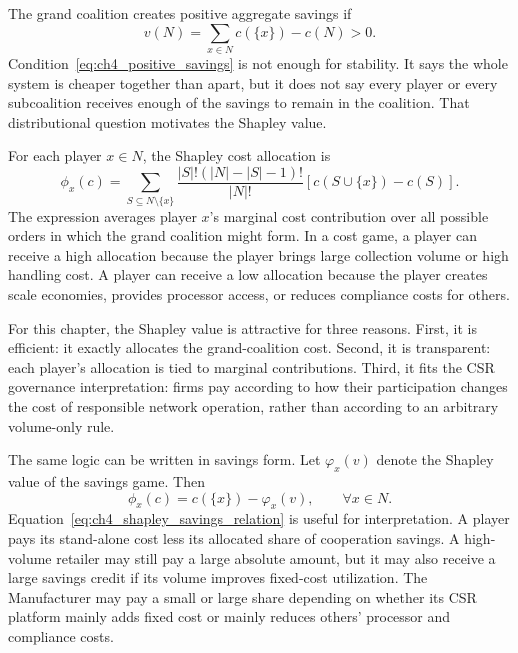 The grand coalition creates positive aggregate savings if
\begin{equation}
\label{eq:ch4_positive_savings}
v(N)=\sum_{x\in N}c(\{x\})-c(N)>0.
\end{equation}
Condition~\eqref{eq:ch4_positive_savings} is not enough for stability. It says the whole system is cheaper together than apart, but it does not say every player or every subcoalition receives enough of the savings to remain in the coalition. That distributional question motivates the Shapley value.

For each player $x\in N$, the Shapley cost allocation is
\begin{equation}
\label{eq:shapley}
\phi_x(c)=
\sum_{S\subseteq N\setminus\{x\}}
\frac{|S|!(|N|-|S|-1)!}{|N|!}
\left[c(S\cup\{x\})-c(S)\right].
\end{equation}
The expression averages player $x$'s marginal cost contribution over all possible orders in which the grand coalition might form. In a cost game, a player can receive a high allocation because the player brings large collection volume or high handling cost. A player can receive a low allocation because the player creates scale economies, provides processor access, or reduces compliance costs for others.

For this chapter, the Shapley value is attractive for three reasons. First, it is efficient: it exactly allocates the grand-coalition cost. Second, it is transparent: each player's allocation is tied to marginal contributions. Third, it fits the CSR governance interpretation: firms pay according to how their participation changes the cost of responsible network operation, rather than according to an arbitrary volume-only rule.

The same logic can be written in savings form. Let $\varphi_x(v)$ denote the Shapley value of the savings game. Then
\begin{equation}
\label{eq:ch4_shapley_savings_relation}
\phi_x(c)=c(\{x\})-\varphi_x(v),
\qquad \forall x\in N.
\end{equation}
Equation~\eqref{eq:ch4_shapley_savings_relation} is useful for interpretation. A player pays its stand-alone cost less its allocated share of cooperation savings. A high-volume retailer may still pay a large absolute amount, but it may also receive a large savings credit if its volume improves fixed-cost utilization. The Manufacturer may pay a small or large share depending on whether its CSR platform mainly adds fixed cost or mainly reduces others' processor and compliance costs.

